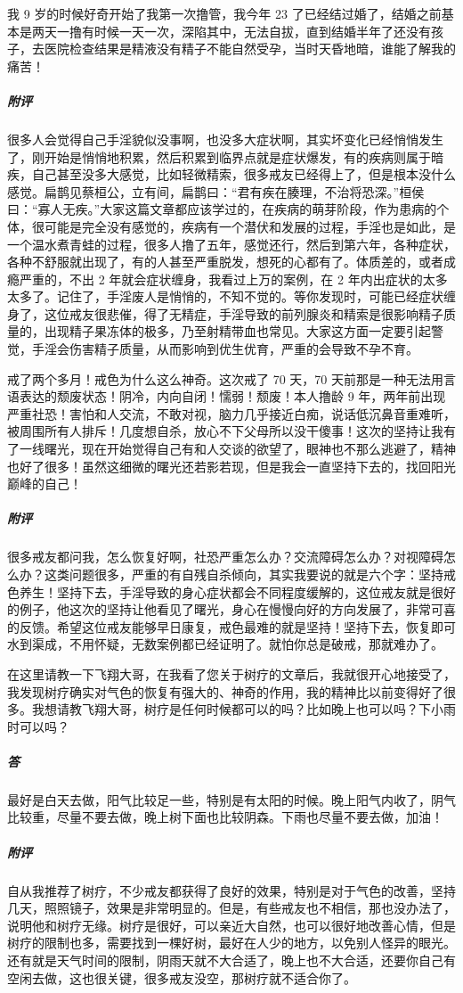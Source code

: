\begin{case}
    我 9 岁的时候好奇开始了我第一次撸管，我今年 23 了已经结过婚了，结婚之前基本是两天一撸有时候一天一次，深陷其中，无法自拔，直到结婚半年了还没有孩子，去医院检查结果是精液没有精子不能自然受孕，当时天昏地暗，谁能了解我的痛苦！
    \subparagraph{附评} 很多人会觉得自己手淫貌似没事啊，也没多大症状啊，其实坏变化已经悄悄发生了，刚开始是悄悄地积累，然后积累到临界点就是症状爆发，有的疾病则属于暗疾，自己甚至没多大感觉，比如轻微精索，很多戒友已经得上了，但是根本没什么感觉。扁鹊见蔡桓公，立有间，扁鹊曰：“君有疾在腠理，不治将恐深。”桓侯曰：“寡人无疾。”大家这篇文章都应该学过的，在疾病的萌芽阶段，作为患病的个体，很可能是完全没有感觉的，疾病有一个潜伏和发展的过程，手淫也是如此，是一个温水煮青蛙的过程，很多人撸了五年，感觉还行，然后到第六年，各种症状，各种不舒服就出现了，有的人甚至严重脱发，想死的心都有了。体质差的，或者成瘾严重的，不出 2 年就会症状缠身，我看过上万的案例，在 2 年内出症状的太多太多了。记住了，手淫废人是悄悄的，不知不觉的。等你发现时，可能已经症状缠身了，这位戒友很悲催，得了无精症，手淫导致的前列腺炎和精索是很影响精子质量的，出现精子果冻体的极多，乃至射精带血也常见。大家这方面一定要引起警觉，手淫会伤害精子质量，从而影响到优生优育，严重的会导致不孕不育。
\end{case}

\begin{case}
    戒了两个多月！戒色为什么这么神奇。这次戒了 70 天，70 天前那是一种无法用言语表达的颓废状态！阴冷，内向自闭！懦弱！颓废！本人撸龄 9 年，两年前出现严重社恐！害怕和人交流，不敢对视，脑力几乎接近白痴，说话低沉鼻音重难听，被周围所有人排斥！几度想自杀，放心不下父母所以没干傻事！这次的坚持让我有了一线曙光，现在开始觉得自己有和人交谈的欲望了，眼神也不那么逃避了，精神也好了很多！虽然这细微的曙光还若影若现，但是我会一直坚持下去的，找回阳光巅峰的自己！
    \subparagraph{附评} 很多戒友都问我，怎么恢复好啊，社恐严重怎么办？交流障碍怎么办？对视障碍怎么办？这类问题很多，严重的有自残自杀倾向，其实我要说的就是六个字：坚持戒色养生！坚持下去，手淫导致的身心症状都会不同程度缓解的，这位戒友就是很好的例子，他这次的坚持让他看见了曙光，身心在慢慢向好的方向发展了，非常可喜的反馈。希望这位戒友能够早日康复，戒色最难的就是坚持！坚持下去，恢复即可水到渠成，不用怀疑，无数案例都已经证明了。就怕你总是破戒，那就难办了。
\end{case}

\begin{case}
    在这里请教一下飞翔大哥，在我看了您关于树疗的文章后，我就很开心地接受了，我发现树疗确实对气色的恢复有强大的、神奇的作用，我的精神比以前变得好了很多。我想请教飞翔大哥，树疗是任何时候都可以的吗？比如晚上也可以吗？下小雨时可以吗？
    \subparagraph{答} 最好是白天去做，阳气比较足一些，特别是有太阳的时候。晚上阳气内收了，阴气比较重，尽量不要去做，晚上树下面也比较阴森。下雨也尽量不要去做，加油！
    \subparagraph{附评} 自从我推荐了树疗，不少戒友都获得了良好的效果，特别是对于气色的改善，坚持几天，照照镜子，效果是非常明显的。但是，有些戒友也不相信，那也没办法了，说明他和树疗无缘。树疗是很好，可以亲近大自然，也可以很好地改善心情，但是树疗的限制也多，需要找到一棵好树，最好在人少的地方，以免别人怪异的眼光。还有就是天气时间的限制，阴雨天就不大合适了，晚上也不大合适，还要你自己有空闲去做，这也很关键，很多戒友没空，那树疗就不适合你了。
\end{case}


